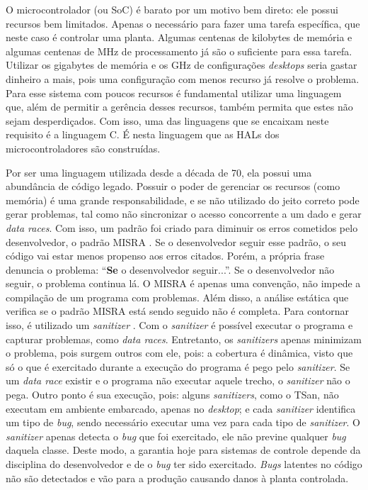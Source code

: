 O microcontrolador (ou \ac{SoC}) é barato por um motivo bem direto: ele possui recursos bem limitados. Apenas o necessário para fazer uma tarefa específica, que neste caso é controlar uma planta. Algumas centenas de kilobytes de memória e algumas centenas de MHz de processamento já são o suficiente para essa tarefa. Utilizar os gigabytes de memória e os GHz de configurações \textit{desktops} seria gastar dinheiro a mais, pois uma configuração com menos recurso já resolve o problema. Para esse sistema com poucos recursos é fundamental utilizar uma linguagem que, além de permitir a gerência desses recursos, também permita que estes não sejam desperdiçados. Com isso, uma das linguagens que se encaixam neste requisito é a linguagem C. É nesta linguagem que as \acp{HAL} dos microcontroladores são construídas. 

Por ser uma linguagem utilizada desde a década de 70, ela possui uma abundância de código legado. Possuir o poder de gerenciar os recursos (como memória) é uma grande responsabilidade, e se não utilizado do jeito correto pode gerar problemas, tal como não sincronizar o acesso concorrente a um dado e gerar \textit{data races}. Com isso, um padrão foi criado para diminuir os erros cometidos pelo desenvolvedor, o padrão \ac{MISRA} \citep{doc:MISRA}. Se o desenvolvedor seguir esse padrão, o seu código vai estar menos propenso aos erros citados. Porém, a própria frase denuncia o problema: ``\textbf{Se} o desenvolvedor seguir...''. Se o desenvolvedor não seguir, o problema continua lá. O \ac{MISRA} é apenas uma convenção, não impede a compilação de um programa com problemas. Além disso, a análise estática que verifica se o padrão \ac{MISRA} está sendo seguido não é completa. Para contornar isso, é utilizado um \textit{sanitizer} \citep{doc:TSan}. Com o \textit{sanitizer} é possível executar o programa e capturar problemas, como \textit{data races}. Entretanto, os \textit{sanitizers} apenas minimizam o problema, pois surgem outros com ele, pois: a cobertura é dinâmica, visto que só o que é exercitado durante a execução do programa é pego pelo \textit{sanitizer}. Se um \textit{data race} existir e o programa não executar aquele trecho, o \textit{sanitizer} não o pega. Outro ponto é sua execução, pois: alguns \textit{sanitizers}, como o \ac{TSan}, não executam em ambiente embarcado, apenas no \textit{desktop}; e cada \textit{sanitizer} identifica um tipo de \textit{bug}, sendo necessário executar uma vez para cada tipo de \textit{sanitizer}. O \textit{sanitizer} apenas detecta o \textit{bug} que foi exercitado, ele não previne qualquer \textit{bug} daquela classe. Deste modo, a garantia hoje para sistemas de controle depende da disciplina do desenvolvedor e de o \textit{bug} ter sido exercitado. \textit{Bugs} latentes no código não são detectados e vão para a produção causando danos à planta controlada.

